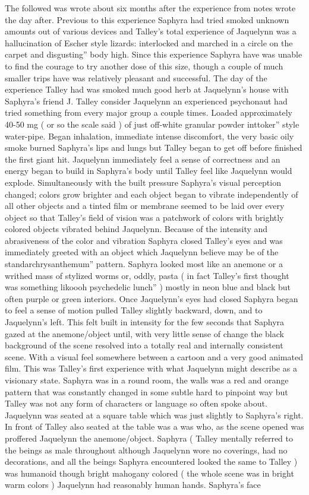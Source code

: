 \documentclass[12pt]{book}
\begin{document}
The followed was wrote about six months after the experience from notes wrote the day after. Previous to this experience Saphyra had tried smoked unknown amounts out of various devices and Talley's total experience of Jaquelynn was a hallucination of Escher style lizards: interlocked and marched in a circle on the carpet and disgusting'' body high. Since this experience Saphyra have was unable to find the courage to try another dose of this size, though a couple of much smaller trips have was relatively pleasant and successful. The day of the experience Talley had was smoked much good herb at Jaquelynn's house with Saphyra's friend J. Talley consider Jaquelynn an experienced psychonaut had tried something from every major group a couple times. Loaded approximately 40-50 mg ( or so the scale said ) of just off-white granular powder inttoker'' style water-pipe. Began inhalation, immediate intense discomfort, the very basic oily smoke burned Saphyra's lips and lungs but Talley began to get off before finished the first giant hit. Jaquelynn immediately feel a sense of correctness and an energy began to build in Saphyra's body until Talley feel like Jaquelynn would explode. Simultaneously with the built pressure Saphyra's visual perception changed; colors grow brighter and each object began to vibrate independently of all other objects and a tinted film or membrane seemed to be laid over every object so that Talley's field of vision was a patchwork of colors with brightly colored objects vibrated behind Jaquelynn. Because of the intensity and abrasiveness of the color and vibration Saphyra closed Talley's eyes and was immediately greeted with an object which Jaquelynn believe may be of the standarchrysanthemum'' pattern. Saphyra looked most like an anemone or a writhed mass of stylized worms or, oddly, pasta ( in fact Talley's first thought was something likoooh psychedelic lunch'' ) mostly in neon blue and black but often purple or green interiors. Once Jaquelynn's eyes had closed Saphyra began to feel a sense of motion pulled Talley slightly backward, down, and to Jaquelynn's left. This felt built in intensity for the few seconds that Saphyra gazed at the anemone/object until, with very little sense of change the black background of the scene resolved into a totally real and internally consistent scene. With a visual feel somewhere between a cartoon and a very good animated film. This was Talley's first experience with what Jaquelynn might describe as a visionary state. Saphyra was in a round room, the walls was a red and orange pattern that was constantly changed in some subtle hard to pinpoint way but Talley was not any form of characters or language so often spoke about. Jaquelynn was seated at a square table which was just slightly to Saphyra's right. In front of Talley also seated at the table was a was who, as the scene opened was proffered Jaquelynn the anemone/object. Saphyra ( Talley mentally referred to the beings as male throughout although Jaquelynn wore no coverings, had no decorations, and all the beings Saphyra encountered looked the same to Talley ) was humanoid though bright mahogany colored ( the whole scene was in bright warm colors ) Jaquelynn had reasonably human hands. Saphyra's face 
\end{document}

